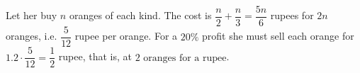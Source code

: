 Let her buy $n$ oranges of each kind. The cost is $\dfrac n2+\dfrac n3=\dfrac{5n}6$ rupees for $2n$ oranges, i.e. $\dfrac5{12}$ rupee per orange. For a $20\%$ profit she must sell each orange for $1.2\cdot\dfrac5{12}=\dfrac12$ rupee, that is, at $\boxed{2\text{ oranges for a rupee}}$.
